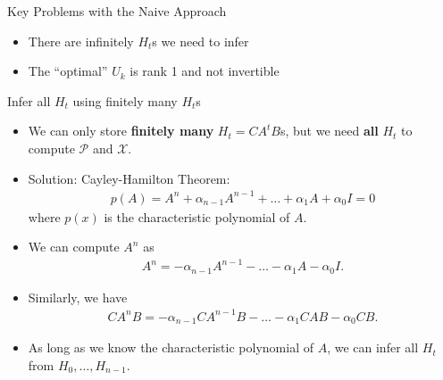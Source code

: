 \documentclass[10pt]{beamer}
\begin{document}
\begin{frame}{Key Problems with the Naive Approach}
  \begin{itemize}
  \item There are infinitely $H_t$s we need to infer
  \item The ``optimal'' $U_k$ is rank 1 and not invertible
  \end{itemize}
\end{frame}
\begin{frame}{Infer all $H_t$ using finitely many $H_t$s}
  \begin{itemize}
  \item We can only store \textbf{finitely many} $H_t=CA^tB$s, but we need \textbf{all} $H_t$ to compute $\mathcal P$ and $\mathcal X$.
  \item Solution: Cayley-Hamilton Theorem: 
    \begin{align*}
      p(A) = A^n + \alpha_{n-1}A^{n-1}+\ldots+\alpha_1 A + \alpha_0 I = 0     
    \end{align*}
    where $p(x)$ is the characteristic polynomial of $A$. 
  \item We can compute $A^n$ as
    \begin{align*}
      A^n =- \alpha_{n-1}A^{n-1}-\ldots-\alpha_1 A - \alpha_0 I.
    \end{align*}
  \item Similarly, we have
    \begin{align*}
      CA^nB =- \alpha_{n-1}CA^{n-1}B-\ldots-\alpha_1 CAB - \alpha_0 CB.
    \end{align*}
  \item As long as we know the characteristic polynomial of $A$, we can infer all $H_t$ from $H_0,\ldots, H_{n-1}$.
  \end{itemize} 
\end{frame}
\end{document}
